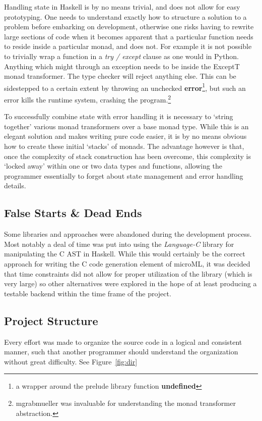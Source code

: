 \documentclass[12pt, a4paper]{report}
\begin{document}
Handling state in Haskell is by no means trivial, and does not allow for easy prototyping. One needs
to understand exactly how to structure a solution to a problem before embarking on development,
otherwise one risks having to rewrite large sections of code when it becomes apparent that a
particular function needs to reside inside a particular monad, and does not. For example it is not
possible to trivially wrap a function in a \textit{try / except} clause as one would in Python.
Anything which might through an exception needs to be inside the ExceptT monad transformer. The type
checker will reject anything else. This can be sidestepped to a certain extent by throwing an
unchecked \textbf{error}\footnote{a wrapper around the prelude library function \textbf{undefined}},
but such an error kills the runtime system, crashing the program.\footnote{mgrabmueller was
invaluable for understanding the monad transformer abstraction.}

To successfully combine state with error handling it is necessary to `string together' various monad
transformers over a base monad type. While this is an elegant solution and makes writing pure code
easier, it is by no means obvious how to create these initial `stacks' of monads. The advantage
however is that, once the complexity of stack construction has been overcome, this complexity is
`locked away' within one or two data types and functions, allowing the programmer essentially to
forget about state management and error handling details. 

\subsection{False Starts \& Dead Ends}
Some libraries and approaches were abandoned during the development process. Most notably a deal of
time was put into using the \textit{Language-C} library for manipulating the C AST in Haskell. While
this would certainly be the correct approach for writing the C code generation element of microML,
it was decided that time constraints did not allow for proper utilization of the library (which is
very large) so other alternatives were explored in the hope of at least producing a testable backend
within the time frame of the project. 

\subsection{Project Structure}
Every effort was made to organize the source code in a logical and consistent manner, such that
another programmer should understand the organization without great difficulty. See
Figure~\ref{fig:dir}
\end{document}
